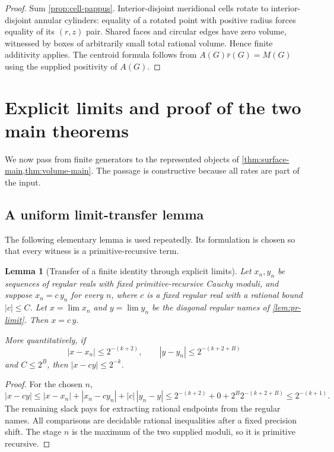 \documentclass[11pt]{article}
\newtheorem{lemma}[theorem]{Lemma}
\theoremstyle{definition}
\newcommand{\abs}[1]{\left|#1\right|}
\begin{document}
\begin{proof}
Sum \cref{prop:cell-pappus}.  Interior-disjoint meridional cells rotate to
interior-disjoint annular cylinders: equality of a rotated point with positive
radius forces equality of its $(r,z)$ pair.  Shared faces and circular edges
have zero volume, witnessed by boxes of arbitrarily small total rational
volume.  Hence finite additivity applies.  The centroid formula follows from
$A(G)\bar r(G)=M(G)$ using the supplied positivity of $A(G)$.
\end{proof}

\section{Explicit limits and proof of the two main theorems}
\label{sec:limits}

We now pass from finite generators to the represented objects of
\cref{thm:surface-main,thm:volume-main}.  The passage is constructive because
all rates are part of the input.

\subsection{A uniform limit-transfer lemma}

The following elementary lemma is used repeatedly.  Its formulation is chosen
so that every witness is a primitive-recursive term.

\begin{lemma}[Transfer of a finite identity through explicit limits]
\label{lem:identity-limit}
Let $x_n,y_n$ be sequences of regular reals with fixed primitive-recursive
Cauchy moduli, and suppose $x_n=c\,y_n$ for every $n$, where $c$ is a fixed
regular real with a rational bound $\abs c\leq C$.  Let $x=\lim x_n$ and
$y=\lim y_n$ be the diagonal regular names of \cref{lem:pr-limit}.  Then
$x=c\,y$.

More quantitatively, if
\[
 \abs{x-x_n}\leq2^{-(k+2)},\qquad
 \abs{y-y_n}\leq2^{-(k+2+B)}
\]
and $C\leq2^B$, then $\abs{x-cy}\leq2^{-k}$.
\end{lemma}

\begin{proof}
For the chosen $n$,
\[
 \abs{x-cy}
 \leq\abs{x-x_n}+\abs{x_n-cy_n}+\abs c\,\abs{y_n-y}
 \leq2^{-(k+2)}+0+2^B2^{-(k+2+B)}
 \leq2^{-(k+1)}.
\]
The remaining slack pays for extracting rational endpoints from the regular
names.  All comparisons are decidable rational inequalities after a fixed
precision shift.  The stage $n$ is the maximum of the two supplied moduli, so
it is primitive recursive.
\end{proof}
\end{document}
